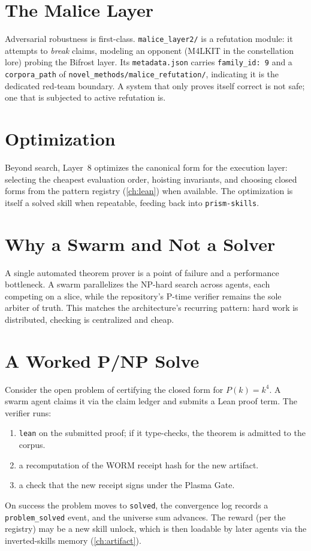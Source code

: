 \section{The Malice Layer}
\label{sec:pnp-malice}

Adversarial robustness is first-class. \texttt{malice\_layer2/} is a
refutation module: it attempts to \emph{break} claims, modeling an opponent
(M4LKIT in the constellation lore) probing the Bifrost layer. Its
\texttt{metadata.json} carries \texttt{family\_id: 9} and a
\texttt{corpora\_path} of \texttt{novel\_methods/malice\_refutation/},
indicating it is the dedicated red-team boundary. A system that only proves
itself correct is not safe; one that is subjected to active refutation is.

\section{Optimization}
\label{sec:pnp-opt}

Beyond search, Layer~8 optimizes the canonical form for the execution layer:
selecting the cheapest evaluation order, hoisting invariants, and choosing
closed forms from the pattern registry (\cref{ch:lean}) when available. The
optimization is itself a solved skill when repeatable, feeding back into
\texttt{prism-skills}.

\section{Why a Swarm and Not a Solver}
\label{sec:pnp-why}

A single automated theorem prover is a point of failure and a performance
bottleneck. A swarm parallelizes the NP-hard search across agents, each
competing on a slice, while the repository's P-time verifier remains the sole
arbiter of truth. This matches the architecture's recurring pattern: hard work
is distributed, checking is centralized and cheap.

\section{A Worked P/NP Solve}
\label{sec:pnp-worked}

Consider the open problem of certifying the closed form for
$P(k)=k^4$. A swarm agent claims it via the claim ledger and submits a
Lean proof term. The verifier runs:
\begin{enumerate}
  \item \texttt{lean} on the submitted proof; if it type-checks, the
        theorem is admitted to the corpus.
  \item a recomputation of the WORM receipt hash for the new artifact.
  \item a check that the new receipt signs under the Plasma Gate.
\end{enumerate}
On success the problem moves to \texttt{solved}, the convergence log
records a \texttt{problem\_solved} event, and the universe sum advances.
The reward (per the registry) may be a new skill unlock, which is then
loadable by later agents via the inverted-skills memory
(\cref{ch:artifact}).
